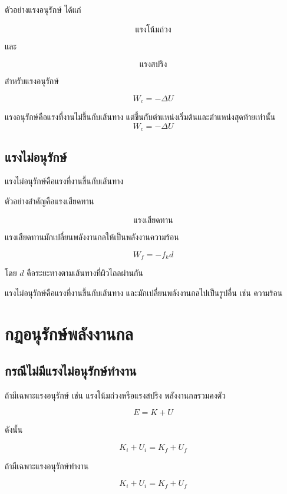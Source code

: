 ตัวอย่างแรงอนุรักษ์ ได้แก่

\[
\text{แรงโน้มถ่วง}
\]

และ

\[
\text{แรงสปริง}
\]

สำหรับแรงอนุรักษ์

\[
W_c=-\Delta U
\]

\begin{tcolorbox}[title=แรงอนุรักษ์]
แรงอนุรักษ์คือแรงที่งานไม่ขึ้นกับเส้นทาง แต่ขึ้นกับตำแหน่งเริ่มต้นและตำแหน่งสุดท้ายเท่านั้น
\[
W_c=-\Delta U
\]
\end{tcolorbox}

\subsection{แรงไม่อนุรักษ์}

แรงไม่อนุรักษ์คือแรงที่งานขึ้นกับเส้นทาง

ตัวอย่างสำคัญคือแรงเสียดทาน

\[
\text{แรงเสียดทาน}
\]

แรงเสียดทานมักเปลี่ยนพลังงานกลให้เป็นพลังงานความร้อน

\[
W_f=-f_k d
\]

โดย $d$ คือระยะทางตามเส้นทางที่ผิวไถลผ่านกัน

\begin{tcolorbox}[title=แรงไม่อนุรักษ์]
แรงไม่อนุรักษ์คือแรงที่งานขึ้นกับเส้นทาง และมักเปลี่ยนพลังงานกลไปเป็นรูปอื่น เช่น ความร้อน
\end{tcolorbox}

\section{กฎอนุรักษ์พลังงานกล}

\subsection{กรณีไม่มีแรงไม่อนุรักษ์ทำงาน}

ถ้ามีเฉพาะแรงอนุรักษ์ เช่น แรงโน้มถ่วงหรือแรงสปริง พลังงานกลรวมคงตัว

\[
E=K+U
\]

ดังนั้น

\[
K_i+U_i=K_f+U_f
\]

\begin{tcolorbox}[title=กฎอนุรักษ์พลังงานกล]
ถ้ามีเฉพาะแรงอนุรักษ์ทำงาน

\[
K_i+U_i=K_f+U_f
\]
\end{tcolorbox}

